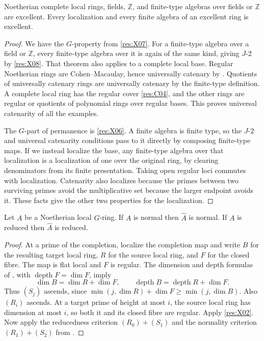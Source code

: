 \begin{theorem}\label{res:X09}
Noetherian complete local rings, fields, \(\mathbb Z\), and finite-type algebras over fields or \(\mathbb Z\) are excellent. Every localization and every finite algebra of an excellent ring is excellent.
\end{theorem}
\begin{proof}
We have the \(G\)-property from \ref{res:X07}. For a finite-type algebra over a field or \(\mathbb Z\), every finite-type algebra over it is again of the same kind, giving \(J\)-2 by \ref{res:X08}. That theorem also applies to a complete local base. Regular Noetherian rings are Cohen--Macaulay, hence universally catenary by \cite[CM-08, CM-15]{core}. Quotients of universally catenary rings are universally catenary by the finite-type definition. A complete local ring has the regular cover \ref{res:C04}, and the other rings are regular or quotients of polynomial rings over regular bases. This proves universal catenarity of all the examples.

The \(G\)-part of permanence is \ref{res:X06}. A finite algebra is finite type, so the \(J\)-2 and universal catenarity conditions pass to it directly by composing finite-type maps. If we instead localize the base, any finite-type algebra over that localization is a localization of one over the original ring, by clearing denominators from its finite presentation. Taking open regular loci commutes with localization. Catenarity also localizes because the primes between two surviving primes avoid the multiplicative set because the larger endpoint avoids it. These facts give the other two properties for the localization.
\end{proof}

\begin{corollary}\label{res:X10}
Let \(A\) be a Noetherian local \(G\)-ring. If \(A\) is normal then \(\widehat A\) is normal. If \(A\) is reduced then \(\widehat A\) is reduced.
\end{corollary}
\begin{proof}
At a prime of the completion, localize the completion map and write \(B\) for the resulting target local ring, \(R\) for the source local ring, and \(F\) for the closed fibre. The map is flat local and \(F\) is regular. The dimension and depth formulas of \cite[CM-10]{core}, with \(\operatorname{depth}F=\dim F\), imply
\[
 \dim B=\dim R+\dim F,\qquad
 \operatorname{depth}B=\operatorname{depth}R+\dim F .
\]
Thus \((S_j)\) ascends, since \(\min(j,\dim R)+\dim F\geq\min(j,\dim B)\). Also \((R_i)\) ascends. At a target prime of height at most \(i\), the source local ring has dimension at most \(i\), so both it and its closed fibre are regular. Apply \ref{res:X02}. Now apply the reducedness criterion \((R_0)+(S_1)\) and the normality criterion \((R_1)+(S_2)\) from \cite[SN-03 and SN-09]{core}.
\end{proof}

